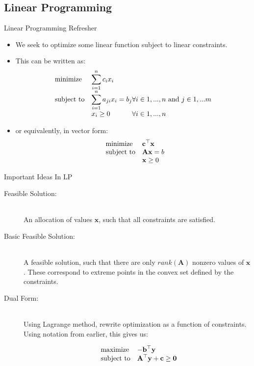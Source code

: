 \documentclass{beamer}
\renewcommand{\vec}[1]{\mathbf{#1}}
\begin{document}
\subsection{Linear Programming}
\begin{frame}{Linear Programming Refresher}
\begin{itemize}
  \item We seek to optimize some linear function subject to linear constraints.
  \item This can be written as:
  \begin{equation*}
  \begin{array}{ll@{}ll@{}rr}
  \text{minimize}  & \displaystyle \sum_{i=1}^n c_i x_i\\
  \text{subject to}& \displaystyle \sum_{i=1}^n a_{ji} x_i = b_{j} & \forall i \in 1,...,n \textrm{ and } j \in 1,...m \\
                   & x_i \geq 0 & \forall i \in 1,...,n
  \end{array}
  \end{equation*}
  \item  or equivalently, in vector form:
  \begin{equation*}
  \begin{array}{ll@{}ll}
  \text{minimize}  & \displaystyle \vec{c}^\top\vec{x}\\
  \text{subject to}& \displaystyle \vec{A}\vec{x}=b\\
                   & \vec{x}\geq 0
  \end{array}
  \end{equation*}


\end{itemize}
\end{frame}

\begin{frame}{Important Ideas In LP}
  \begin{description}
    \item[Feasible Solution:] \hfill \\ An allocation of values $\vec{x}$, such that all constraints are satisfied.
    \item[Basic Feasible Solution:] \hfill \\ A feasible solution, such
    that there are only $\mathit{rank}(\vec{A})$ nonzero values of $\vec{x}$. These correspond to extreme points in the convex set defined by the constraints.
    \item[Dual Form:] \hfill \\ Using Lagrange method, rewrite optimization as a function of constraints. Using notation from earlier, this gives us:

    \begin{equation*}
    \begin{array}{ll@{}ll}
    \text{maximize}  & \displaystyle -\vec{b}^\top\vec{y}\\
    \text{subject to}& \displaystyle \vec{A}^\top\vec{y} + \vec{c} \geq \vec{0}
    \end{array}
    \end{equation*}

  \end{description}
\end{frame}
\end{document}
